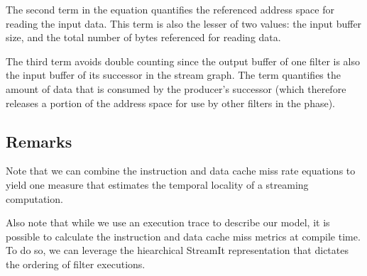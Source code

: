 The second term in the equation quantifies the referenced address space 
for reading the input data. This term is also the lesser of two
values: the input buffer size, and the total number of bytes referenced for
reading data.

The third term avoids double counting since the output buffer of one
filter is also the input buffer of its successor in the stream
graph. The term quantifies the amount of data that is consumed by the
producer's successor (which therefore releases a portion of the
address space for use by other filters in the phase).

\subsection{Remarks}

Note  that we can  combine the  instruction and  data cache  miss rate
equations to yield one measure that estimates the temporal locality of
a streaming computation.

Also note that while we use  an execution trace to describe our model,
it  is possible  to  calculate  the instruction  and  data cache  miss
metrics at  compile time.  To do so,  we can leverage  the hiearchical
StreamIt   representation  that  dictates   the  ordering   of  filter
executions.
